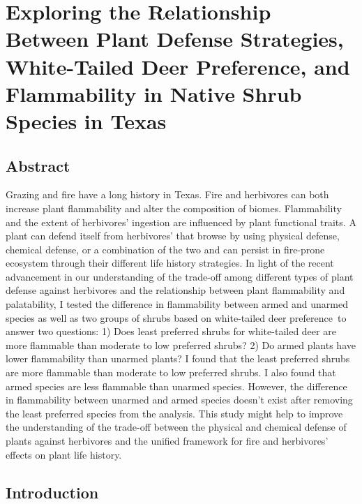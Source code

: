 \documentclass[12pt]{report}
\begin{document}
\chapter{Exploring the Relationship Between Plant Defense Strategies, White-Tailed Deer Preference, and Flammability in Native Shrub Species in Texas} 

\section{Abstract}

Grazing and fire have a long history in Texas. Fire and herbivores can both increase plant flammability and alter the composition of biomes. Flammability and the extent of herbivores' ingestion are influenced by plant functional traits. A plant can defend itself from herbivores' that browse by using physical defense, chemical defense, or a combination of the two and can persist in fire-prone ecosystem through their different life history strategies. In light of the recent advancement in our understanding of the trade-off among different types of plant defense against herbivores and the relationship between plant flammability and palatability, I tested the difference in flammability between armed and unarmed species as well as two groups of shrubs based on white-tailed deer preference to answer two questions: 1) Does least preferred shrubs for white-tailed deer are more flammable than moderate to low preferred shrubs? 2) Do armed plants have lower flammability than unarmed plants? I found that the least preferred shrubs are more flammable than moderate to low preferred shrubs. I also found that armed species are less flammable than unarmed species. However, the difference in flammability between unarmed and armed species doesn't exist after removing the least preferred species from the analysis. This study might help to improve the understanding of the trade-off between the physical and chemical defense of plants against herbivores and the unified framework for fire and herbivores' effects on plant life history. 


\section{Introduction}
\end{document}
